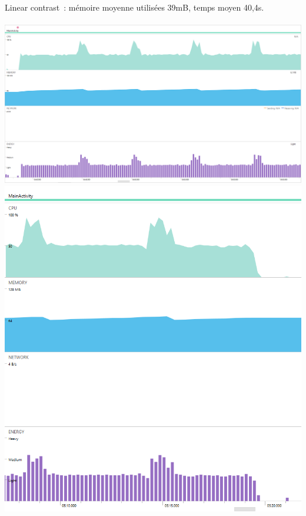 \documentclass[12pt]{article}
\begin{document}
\\
\\
\\
    Linear contrast : mémoire moyenne utilisées 39mB, temps moyen 40,4s.\\


    \\

    

    \includegraphics{linelong1}
    \includegraphics{linelong2}


\\
\\
\\
\end{document}
